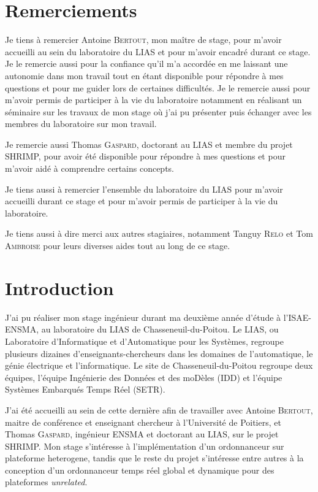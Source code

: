 \documentclass{article}
\begin{document}
    \newpage
    \section*{Remerciements}

    Je tiens à remercier Antoine \textsc{Bertout}, mon maître de stage, pour m'avoir accueilli au sein du laboratoire du LIAS et pour m'avoir encadré durant ce stage. Je le remercie aussi pour la confiance qu'il m'a accordée en me laissant une autonomie dans mon travail tout en étant disponible pour répondre à mes questions et pour me guider lors de certaines difficultés. Je le remercie aussi pour m'avoir permis de participer à la vie du laboratoire notamment en réalisant un séminaire sur les travaux de mon stage où j'ai pu présenter puis échanger avec les membres du laboratoire sur mon travail.
    
    Je remercie aussi Thomas \textsc{Gaspard}, doctorant au LIAS et membre du projet SHRIMP, pour avoir été disponible pour répondre à mes questions et pour m'avoir aidé à comprendre certains concepts.

    Je tiens aussi à remercier l'ensemble du laboratoire du LIAS pour m'avoir accueilli durant ce stage et pour m'avoir permis de participer à la vie du laboratoire.

    Je tiens aussi à dire merci aux autres stagiaires, notamment Tanguy \textsc{Relo} et Tom \textsc{Ambroise} pour leurs diverses aides tout au long de ce stage.
    
    \newpage
    \tableofcontents

    \newpage
    \thispagestyle{empty}
    \mbox{}
    \newpage
    
    \section{Introduction}

    
    J'ai pu réaliser mon stage ingénieur durant ma deuxième année d'étude à l'ISAE-ENSMA, au laboratoire du LIAS de Chasseneuil-du-Poitou. Le LIAS, ou Laboratoire d'Informatique et d'Automatique pour les Systèmes, regroupe plusieurs dizaines d'enseignants-chercheurs dans les domaines de l'automatique, le génie électrique et l'informatique. Le site de Chasseneuil-du-Poitou regroupe deux équipes, l'équipe Ingénierie des Données et des moDèles (IDD) et l'équipe Systèmes Embarqués Temps Réel (SETR). 

    J'ai été accueilli au sein de cette dernière afin de travailler avec Antoine \textsc{Bertout}, maitre de conférence et enseignant chercheur à l'Université de Poitiers, et Thomas \textsc{Gaspard}, ingénieur ENSMA et doctorant au LIAS, sur le projet \gls{SHRIMP}. Mon stage s'intéresse à l'implémentation d'un \gls{ordonnanceur} sur \gls{plateforme heterogene}\cite{bertout2020workload}, tandis que le reste du projet s'intéresse entre autres à la conception d'un \gls{ordonnanceur} temps réel global et dynamique pour des plateformes \textit{unrelated}.
\end{document}
